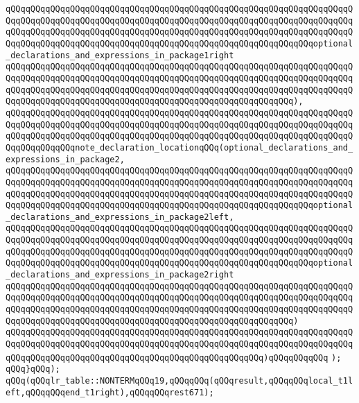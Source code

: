 \verb|qQQqqQQqqQQqqQQqqQQqqQQqqQQqqQQqqQQqqQQqqQQqqQQqqQQqqQQqqQQqqQQqqQQqqQQqqQQqqQQqqQQqqQQqqQQqqQQqqQQqqQQqqQQqqQQqqQQqqQQqqQQqqQQqqQQqqQQqqQQqqQQqqQQqqQQqqQQqqQQqqQQqqQQqqQQqqQQqqQQqqQQqqQQqqQQqqQQqqQQqqQQqqQQqqQQqqQQqqQQqqQQqqQQqqQQqqQQqqQQqqQQqqQQqqQQqqQQqqQQqqQQqqQQqqQQqoptional_declarations_and_expressions_in_package1right|\newline
\verb|qQQqqQQqqQQqqQQqqQQqqQQqqQQqqQQqqQQqqQQqqQQqqQQqqQQqqQQqqQQqqQQqqQQqqQQqqQQqqQQqqQQqqQQqqQQqqQQqqQQqqQQqqQQqqQQqqQQqqQQqqQQqqQQqqQQqqQQqqQQqqQQqqQQqqQQqqQQqqQQqqQQqqQQqqQQqqQQqqQQqqQQqqQQqqQQqqQQqqQQqqQQqqQQqqQQqqQQqqQQqqQQqqQQqqQQqqQQqqQQqqQQqqQQqqQQqqQQqqQQqqQQqqQQq),|\newline
\verb|qQQqqQQqqQQqqQQqqQQqqQQqqQQqqQQqqQQqqQQqqQQqqQQqqQQqqQQqqQQqqQQqqQQqqQQqqQQqqQQqqQQqqQQqqQQqqQQqqQQqqQQqqQQqqQQqqQQqqQQqqQQqqQQqqQQqqQQqqQQqqQQqqQQqqQQqqQQqqQQqqQQqqQQqqQQqqQQqqQQqqQQqqQQqqQQqqQQqqQQqqQQqqQQqqQQqqQQqqQQqqQQqnote_declaration_locationqQQq(optional_declarations_and_expressions_in_package2,|\newline
\verb|qQQqqQQqqQQqqQQqqQQqqQQqqQQqqQQqqQQqqQQqqQQqqQQqqQQqqQQqqQQqqQQqqQQqqQQqqQQqqQQqqQQqqQQqqQQqqQQqqQQqqQQqqQQqqQQqqQQqqQQqqQQqqQQqqQQqqQQqqQQqqQQqqQQqqQQqqQQqqQQqqQQqqQQqqQQqqQQqqQQqqQQqqQQqqQQqqQQqqQQqqQQqqQQqqQQqqQQqqQQqqQQqqQQqqQQqqQQqqQQqqQQqqQQqqQQqqQQqqQQqqQQqqQQqqQQqoptional_declarations_and_expressions_in_package2left,|\newline
\verb|qQQqqQQqqQQqqQQqqQQqqQQqqQQqqQQqqQQqqQQqqQQqqQQqqQQqqQQqqQQqqQQqqQQqqQQqqQQqqQQqqQQqqQQqqQQqqQQqqQQqqQQqqQQqqQQqqQQqqQQqqQQqqQQqqQQqqQQqqQQqqQQqqQQqqQQqqQQqqQQqqQQqqQQqqQQqqQQqqQQqqQQqqQQqqQQqqQQqqQQqqQQqqQQqqQQqqQQqqQQqqQQqqQQqqQQqqQQqqQQqqQQqqQQqqQQqqQQqqQQqqQQqqQQqqQQqoptional_declarations_and_expressions_in_package2right|\newline
\verb|qQQqqQQqqQQqqQQqqQQqqQQqqQQqqQQqqQQqqQQqqQQqqQQqqQQqqQQqqQQqqQQqqQQqqQQqqQQqqQQqqQQqqQQqqQQqqQQqqQQqqQQqqQQqqQQqqQQqqQQqqQQqqQQqqQQqqQQqqQQqqQQqqQQqqQQqqQQqqQQqqQQqqQQqqQQqqQQqqQQqqQQqqQQqqQQqqQQqqQQqqQQqqQQqqQQqqQQqqQQqqQQqqQQqqQQqqQQqqQQqqQQqqQQqqQQqqQQqqQQqqQQqqQQq)|\newline
\verb|qQQqqQQqqQQqqQQqqQQqqQQqqQQqqQQqqQQqqQQqqQQqqQQqqQQqqQQqqQQqqQQqqQQqqQQqqQQqqQQqqQQqqQQqqQQqqQQqqQQqqQQqqQQqqQQqqQQqqQQqqQQqqQQqqQQqqQQqqQQqqQQqqQQqqQQqqQQqqQQqqQQqqQQqqQQqqQQqqQQqqQQqqQQqqQQq)qQQqqQQqqQQq|\newline
\verb|);|\newline
\verb|qQQq}qQQq);|\newline
\verb|qQQq(qQQqlr_table::NONTERMqQQq19,qQQqqQQq(qQQqresult,qQQqqQQqlocal_t1left,qQQqqQQqend_t1right),qQQqqQQqrest671);|\newline
